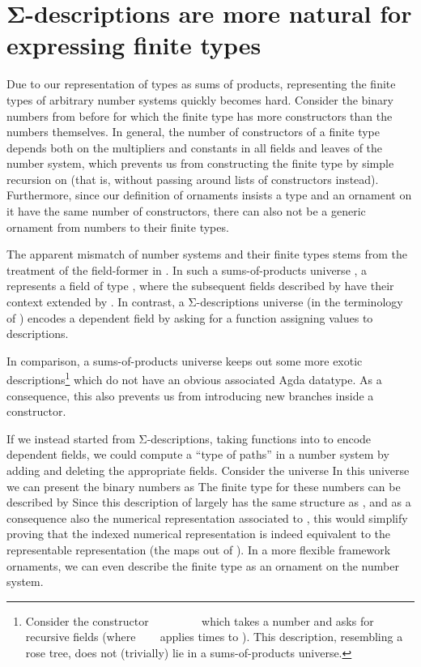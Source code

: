 \section{Σ-descriptions are more natural for expressing finite types}\label{sec:closed-universe}
Due to our representation of types as sums of products, representing the finite types of arbitrary number systems quickly becomes hard. Consider the binary numbers from before
for which the finite type
has more constructors than the numbers themselves. In general, the number of constructors of a finite type depends both on the multipliers and constants in all fields and leaves of the number system, which prevents us from constructing the finite type by simple recursion on  (that is, without passing around lists of constructors instead). Furthermore, since our definition of ornaments insists a type and an ornament on it have the same number of constructors, there can also not be a generic ornament from numbers to their finite types. 

The apparent mismatch of number systems and their finite types stems from the treatment of the field-former  in . In such a sums-of-products universe \cite{practgen,sijsling}, a \ \  represents a field of type , where the subsequent fields described by  have their context extended by . In contrast, a Σ-descriptions universe \cite{effectfully,progorn,algorn} (in the terminology of \cite{sijsling}) encodes a dependent field  by asking for a function  assigning values  to descriptions.

In comparison, a sums-of-products universe keeps out some more exotic descriptions\footnote{Consider the constructor \ \bN{}\ \ \ \ \ \ \  which takes a number  and asks for  recursive fields (where \ \ \  applies   times to ). This description, resembling a rose tree, does not (trivially) lie in a sums-of-products universe.} which do not have an obvious associated Agda datatype. As a consequence, this also prevents us from introducing new branches inside a constructor.

If we instead started from Σ-descriptions, taking functions into  to encode dependent fields, we could compute a ``type of paths'' in a number system by adding and deleting the appropriate fields. Consider the universe
In this universe we can present the binary numbers as
The finite type for these numbers can be described by
Since this description of  largely has the same structure as , and as a consequence also the numerical representation associated to , this would simplify proving that the indexed numerical representation is indeed equivalent to the representable representation (the maps out of ). In a more flexible framework ornaments, we can even describe the finite type as an ornament on the number system.


